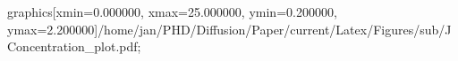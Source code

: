 graphics[xmin=0.000000, xmax=25.000000, ymin=0.200000, ymax=2.200000]{/home/jan/PHD/Diffusion/Paper/current/Latex/Figures/sub/JConcentration_plot.pdf}; 
